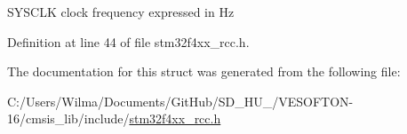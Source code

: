 S\+Y\+S\+C\+LK clock frequency expressed in Hz 

Definition at line 44 of file stm32f4xx\+\_\+rcc.\+h.



The documentation for this struct was generated from the following file\+:\begin{DoxyCompactItemize}
\item 
C\+:/\+Users/\+Wilma/\+Documents/\+Git\+Hub/\+S\+D\+\_\+\+H\+U\+\_/\+V\+E\+S\+O\+F\+T\+O\+N-\/16/cmsis\+\_\+lib/include/\hyperlink{stm32f4xx__rcc_8h}{stm32f4xx\+\_\+rcc.\+h}\end{DoxyCompactItemize}
